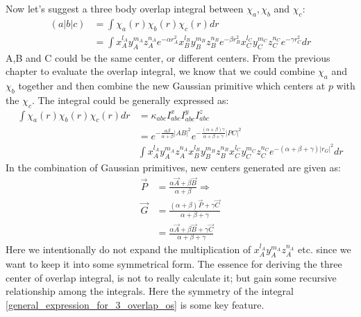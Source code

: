 Now let's suggest a three body overlap integral between $\chi_{a}, \chi_{b}$
and $\chi_{c}$:
\begin{equation}
 \begin{split}
(a|b|c) &= \int \chi_{a}(r)\chi_{b}(r)\chi_{c}(r) dr \\
&= \int x^{l_{A}}_{A}y^{m_{A}}_{A}z^{n_{A}}_{A}e^{-\alpha r_{A}^{2}}
        x^{l_{B}}_{B}y^{m_{B}}_{B}z^{n_{B}}_{B}e^{-\beta  r_{B}^{2}} 
        x^{l_{C}}_{C}y^{m_{C}}_{C}z^{n_{C}}_{C}e^{-\gamma r_{C}^{2}}dr
 \end{split}
\label{OS_three_overlap_int_eq:1}
\end{equation}
A,B and C could be the same center, or different centers. From the previous
chapter to evaluate the overlap integral, we know that we could combine
$\chi_{a}$ and $\chi_{b}$ together and then combine the new Gaussian primitive
which centers at $p$ with the $\chi_{c}$. The integral could be generally expressed as:
\begin{equation}
\label{general_expression_for_3_overlap_os}
\begin{split}
 \int \chi_{a}(r)\chi_{b}(r)\chi_{c}(r) dr &= 
\kappa_{abc}I_{abc}^{x}I_{abc}^{y}I_{abc}^{z} \\
&= e^{-\frac{\alpha\beta}{\alpha+\beta}|AB|^{2}}
e^{-\frac{(\alpha+\beta)\gamma}{\alpha+\beta+\gamma}|PC|^{2}} \\
& \int x^{l_{A}}_{A}y^{m_{A}}_{A}z^{n_{A}}_{A}
       x^{l_{B}}_{B}y^{m_{B}}_{B}z^{n_{B}}_{B}
       x^{l_{C}}_{C}y^{m_{C}}_{C}z^{n_{C}}_{C} 
e^{-(\alpha+\beta+\gamma)|r_{G}|^{2}} dr        
\end{split}
\end{equation}
In the combination of Gaussian primitives, new centers generated are given as:
\begin{equation}
 \begin{split}
  \overrightarrow{P} &= \frac{\alpha \overrightarrow{A} + 
\beta \overrightarrow{B}}{\alpha+\beta}
\Rightarrow \\
  \overrightarrow{G} &= \frac{(\alpha+\beta)\overrightarrow{P} + \gamma
\overrightarrow{C}}{ \alpha+\beta +\gamma } \\
    &= \frac{\alpha \overrightarrow{A} + \beta \overrightarrow{B} + 
\gamma \overrightarrow{C}}{ \alpha+\beta +\gamma }
 \end{split}
\label{OS_three_overlap_int_eq:2}
\end{equation}
Here we intentionally do not expand the multiplication of 
$x^{l_{A}}_{A}y^{m_{A}}_{A}z^{n_{A}}_{A}$ etc. since we want to keep it
into some symmetrical form. The essence for deriving the three center of 
overlap integral, is not to really calculate it; but gain some recursive relationship
among the integrals. Here the symmetry of the integral \ref{general_expression_for_3_overlap_os}
is some key feature.

